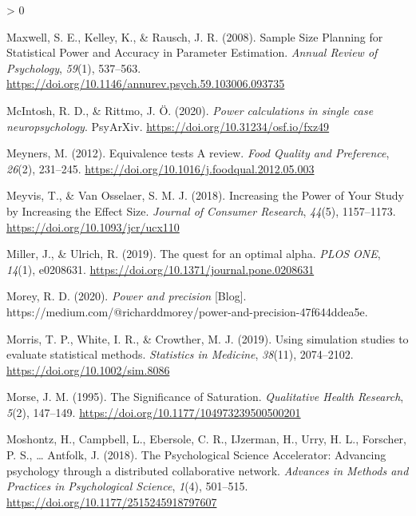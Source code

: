 \documentclass[
  english,
  ,jou,floatsintext]{apa6}
\newlength{\cslhangindent}
\newenvironment{CSLReferences}[2] %
 {%
  \setlength{\parindent}{0pt}
  \ifodd #1 \everypar{\setlength{\hangindent}{\cslhangindent}}\ignorespaces\fi
  \ifnum #2 > 0
  \setlength{\parskip}{#2\baselineskip}
  \fi
 }%
 {}
\begin{document}
\begin{CSLReferences}{1}{0}
\leavevmode\hypertarget{ref-maxwell_sample_2008}{}%
Maxwell, S. E., Kelley, K., \& Rausch, J. R. (2008). Sample {Size Planning} for {Statistical Power} and {Accuracy} in {Parameter Estimation}. \emph{Annual Review of Psychology}, \emph{59}(1), 537--563. \url{https://doi.org/10.1146/annurev.psych.59.103006.093735}

\leavevmode\hypertarget{ref-mcintosh_power_2020}{}%
McIntosh, R. D., \& Rittmo, J. Ö. (2020). \emph{Power calculations in single case neuropsychology}. {PsyArXiv}. \url{https://doi.org/10.31234/osf.io/fxz49}

\leavevmode\hypertarget{ref-meyners_equivalence_2012}{}%
Meyners, M. (2012). Equivalence tests {} {A} review. \emph{Food Quality and Preference}, \emph{26}(2), 231--245. \url{https://doi.org/10.1016/j.foodqual.2012.05.003}

\leavevmode\hypertarget{ref-meyvis_increasing_2018}{}%
Meyvis, T., \& Van Osselaer, S. M. J. (2018). Increasing the {Power} of {Your Study} by {Increasing} the {Effect Size}. \emph{Journal of Consumer Research}, \emph{44}(5), 1157--1173. \url{https://doi.org/10.1093/jcr/ucx110}

\leavevmode\hypertarget{ref-miller_quest_2019}{}%
Miller, J., \& Ulrich, R. (2019). The quest for an optimal alpha. \emph{PLOS ONE}, \emph{14}(1), e0208631. \url{https://doi.org/10.1371/journal.pone.0208631}

\leavevmode\hypertarget{ref-morey_power_2020}{}%
Morey, R. D. (2020). \emph{Power and precision} {[}Blog{]}. https://medium.com/@richarddmorey/power-and-precision-47f644ddea5e.

\leavevmode\hypertarget{ref-morris_using_2019}{}%
Morris, T. P., White, I. R., \& Crowther, M. J. (2019). Using simulation studies to evaluate statistical methods. \emph{Statistics in Medicine}, \emph{38}(11), 2074--2102. \url{https://doi.org/10.1002/sim.8086}

\leavevmode\hypertarget{ref-morse_significance_1995}{}%
Morse, J. M. (1995). The {Significance} of {Saturation}. \emph{Qualitative Health Research}, \emph{5}(2), 147--149. \url{https://doi.org/10.1177/104973239500500201}

\leavevmode\hypertarget{ref-moshontz_psychological_2018}{}%
Moshontz, H., Campbell, L., Ebersole, C. R., IJzerman, H., Urry, H. L., Forscher, P. S., \ldots{} Antfolk, J. (2018). The {Psychological Science Accelerator}: {Advancing} psychology through a distributed collaborative network. \emph{Advances in Methods and Practices in Psychological Science}, \emph{1}(4), 501--515. \url{https://doi.org/10.1177/2515245918797607}


\end{CSLReferences}
\end{document}
